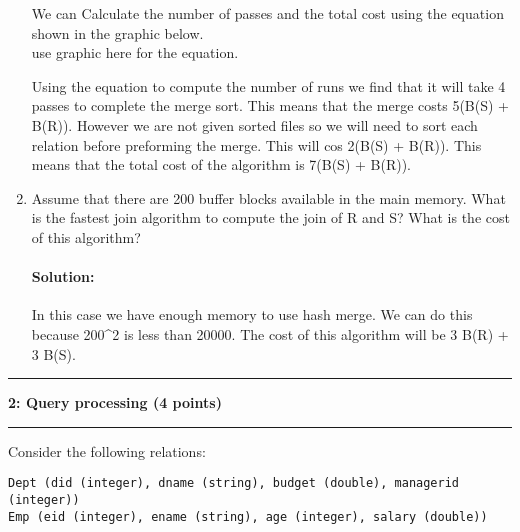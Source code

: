 \documentclass[11pt]{article}
\newcommand\question[2]{\vspace{.25in}\hrule\textbf{#1: #2}\vspace{.5em}\hrule\vspace{.10in}}
\begin{document}
\begin{enumerate}
We can Calculate the number of passes and the total cost using the equation shown in the graphic below.\\

use graphic here for the equation.

Using the equation to compute the number of runs we find that it will take 4 passes to complete the merge sort. This means that the merge costs 5(B(S) + B(R)). However we are not given sorted files so we will need to sort each relation before preforming the merge. This will cos 2(B(S) + B(R)). This means that the total cost of the algorithm is 7(B(S) + B(R)).\\


\item Assume that there are 200 buffer blocks available in the main memory. What is the fastest join 
algorithm to compute the join of R and S? What is the cost of this algorithm? 

\paragraph{Solution:} \hfill \break

In this case we have enough memory to use hash merge. We can do this because 200^2 is less than 20000. The cost of this algorithm will be 3 B(R) + 3 B(S).\\

\end{enumerate}



\question{2}{Query processing  (4 points)}
Consider the following relations:
\begin{verbatim}
Dept (did (integer), dname (string), budget (double), managerid (integer))
Emp (eid (integer), ename (string), age (integer), salary (double))
\end{verbatim}
\end{document}
